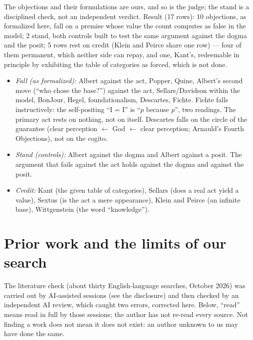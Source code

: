 \documentclass[11pt,a4paper]{article}
\begin{document}
The objections and their formulations are ours, and so is the judge; the stand is a disciplined check, not an
independent verdict. Result (17 rows): 10 objections, as formalized here, fall on a premise whose value the count computes as false in the
model; 2 stand, both controls built to test the same argument against the dogma and the posit; 5 rows rest on credit
(Klein and Peirce share one row) --- four of them permanent, which neither side can repay, and one, Kant's,
redeemable in principle by exhibiting the table of categories as forced, which is not done.
\begin{itemize}
\item \emph{Fall (as formalized):} Albert against the act, Popper, Quine, Albert's second move (``who chose the base?'') against the
  act, Sellars/Davidson within the model, BonJour, Hegel, foundationalism, Descartes, Fichte. Fichte falls
  instructively: the self-positing ``I = I'' is ``$p$ because $p$'', two readings. The primary act rests on nothing,
  not on itself. Descartes falls on the circle of the guarantee (clear perception $\leftarrow$ God $\leftarrow$ clear
  perception; Arnauld's Fourth Objections), not on the cogito.
\item \emph{Stand (controls):} Albert against the dogma and Albert against a posit. The argument that fails against the act
  holds against the dogma and against the posit.
\item \emph{Credit:} Kant (the given table of categories), Sellars (does a real act yield a value), Sextus (is the act
  a mere appearance), Klein and Peirce (an infinite base), Wittgenstein (the word ``knowledge'').
\end{itemize}

\section{Prior work and the limits of our search}

The literature check (about thirty English-language searches, October 2026) was carried out by AI-assisted
sessions (see the disclosure) and then checked by an independent AI review, which caught two errors, corrected
here. Below, ``read'' means read in full by those sessions; the author has not re-read every source. Not finding a work
does not mean it does not exist: an author unknown to us may have done the same.
\end{document}
